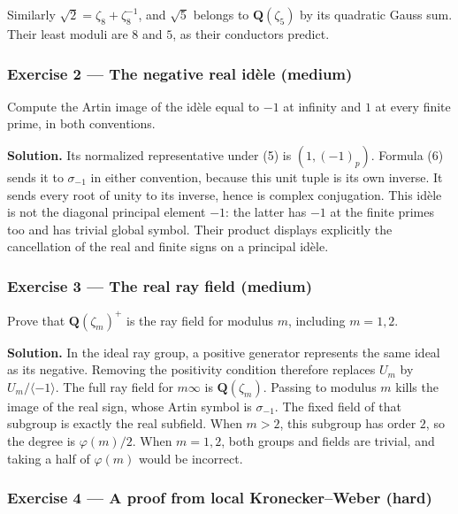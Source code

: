 \documentclass[11pt,a4paper]{article}
\begin{document}
Similarly \(\sqrt2=\zeta_8+\zeta_8^{-1}\), and \(\sqrt5\) belongs to
\(\mathbf Q(\zeta_5)\) by its quadratic Gauss sum. Their least moduli
are \(8\) and \(5\), as their conductors predict.

\subsubsection{Exercise 2 --- The negative real idèle
(medium)}\label{exercise-2-the-negative-real-iduxe8le-medium}

Compute the Artin image of the idèle equal to \(-1\) at infinity and
\(1\) at every finite prime, in both conventions.

\textbf{Solution.} Its normalized representative under (5) is
\((1,(-1)_p)\). Formula (6) sends it to \(\sigma_{-1}\) in either
convention, because this unit tuple is its own inverse. It sends every
root of unity to its inverse, hence is complex conjugation. This idèle
is not the diagonal principal element \(-1\): the latter has \(-1\) at
the finite primes too and has trivial global symbol. Their product
displays explicitly the cancellation of the real and finite signs on a
principal idèle.

\subsubsection{Exercise 3 --- The real ray field
(medium)}\label{exercise-3-the-real-ray-field-medium}

Prove that \(\mathbf Q(\zeta_m)^+\) is the ray field for modulus \(m\),
including \(m=1,2\).

\textbf{Solution.} In the ideal ray group, a positive generator
represents the same ideal as its negative. Removing the positivity
condition therefore replaces \(U_m\) by \(U_m/\langle-1\rangle\). The
full ray field for \(m\infty\) is \(\mathbf Q(\zeta_m)\). Passing to
modulus \(m\) kills the image of the real sign, whose Artin symbol is
\(\sigma_{-1}\). The fixed field of that subgroup is exactly the real
subfield. When \(m>2\), this subgroup has order \(2\), so the degree is
\(\varphi(m)/2\). When \(m=1,2\), both groups and fields are trivial,
and taking a half of \(\varphi(m)\) would be incorrect.

\subsubsection{Exercise 4 --- A proof from local Kronecker--Weber
(hard)}\label{exercise-4-a-proof-from-local-kroneckerweber-hard}
\end{document}
